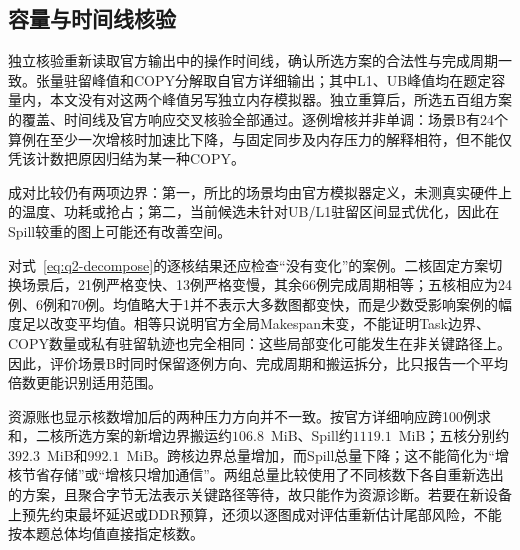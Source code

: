 \subsection{容量与时间线核验}

独立核验重新读取官方输出中的操作时间线，确认所选方案的合法性与完成周期一致。张量驻留峰值和COPY分解取自官方详细输出；其中L1、UB峰值均在题定容量内，本文没有对这两个峰值另写独立内存模拟器。独立重算后，所选五百组方案的覆盖、时间线及官方响应交叉核验全部通过。逐例增核并非单调：场景B有24个算例在至少一次增核时加速比下降，与固定同步及内存压力的解释相符，但不能仅凭该计数把原因归结为某一种COPY。

成对比较仍有两项边界：第一，所比的场景均由官方模拟器定义，未测真实硬件上的温度、功耗或抢占；第二，当前候选未针对UB/L1驻留区间显式优化，因此在Spill较重的图上可能还有改善空间。

对式~\eqref{eq:q2-decompose}的逐核结果还应检查“没有变化”的案例。二核固定方案切换场景后，21例严格变快、13例严格变慢，其余66例完成周期相等；五核相应为24例、6例和70例。均值略大于1并不表示大多数图都变快，而是少数受影响案例的幅度足以改变平均值。相等只说明官方全局Makespan未变，不能证明Task边界、COPY数量或私有驻留轨迹也完全相同：这些局部变化可能发生在非关键路径上。因此，评价场景B时同时保留逐例方向、完成周期和搬运拆分，比只报告一个平均倍数更能识别适用范围。

资源账也显示核数增加后的两种压力方向并不一致。按官方详细响应跨100例求和，二核所选方案的新增边界搬运约$106.8$~MiB、Spill约$1119.1$~MiB；五核分别约$392.3$~MiB和$992.1$~MiB。跨核边界总量增加，而Spill总量下降；这不能简化为“增核节省存储”或“增核只增加通信”。两组总量比较使用了不同核数下各自重新选出的方案，且聚合字节无法表示关键路径等待，故只能作为资源诊断。若要在新设备上预先约束最坏延迟或DDR预算，还须以逐图成对评估重新估计尾部风险，不能按本题总体均值直接指定核数。







